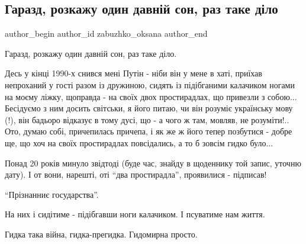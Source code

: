  
 
 
 
 
 
\subsection{Гаразд, розкажу один давній сон, раз таке діло}
\label{sec:21_02_2022.fb.zabuzhko_oksana.1.son_putin}
 
\ifcmt
 author_begin
   author_id zabuzhko_oksana
 author_end
\fi

Гаразд, розкажу один давній сон, раз таке діло. 

Десь у кінці 1990-х снився мені Путін - ніби він у мене в хаті, приїхав
непроханий у гості разом із дружиною, сидять із підібганими калачиком ногами на
моєму ліжку, щоправда - на своїх двох простирадлах, що привезли з собою...
Бесідуємо з ним досить світськи, я його питаю, чи він розуміє українську мову
(!), він бадьоро відказує в тому дусі, що - а чого ж там, мовляв, не
розуміти!.. Ото, думаю собі, причепилась причепа, і як же ж його тепер
позбутися - добре ще, що хоч на своїх простирадлах повсідались, а то б зовсім
гидко було...

Понад 20 років минуло звідтоді (буде час, знайду в щоденнику той запис, уточню
дату). І от вони, нарешті, оті \enquote{два простирадла}, проявилися - підписав!

\enquote{Прізнанниє государства}. 

На них і сидітиме - підібгавши ноги калачиком. І псуватиме нам життя.

Гидка така війна, гидка-прегидка. Гидомирна просто.

